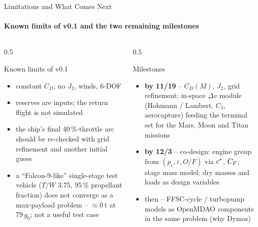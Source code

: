 \documentclass[aspectratio=169,10pt]{beamer}
\providecommand{\dv}{\Delta v}\providecommand{\gz}{g_0}\providecommand{\pc}{p_c}\providecommand{\dd}{\mathrm{d}}\providecommand{\eps}{\varepsilon}
\begin{document}
\begin{frame}{Limitations and What Comes Next}
  \framesubtitle{Known limits of v0.1 and the two remaining milestones}
  \begin{columns}[T]
    \begin{column}{0.5\textwidth}
      \begin{block}{Known limits of v0.1}
        \begin{itemize}
          \item constant $C_D$; no $J_2$, winds, 6-DOF
          \item reserves are inputs; the return flight is not simulated
          \item the ship's final 40\,\%-throttle arc should be re-checked with grid refinement and another initial guess
          \item a ``Falcon-9-like'' single-stage test vehicle ($T/W$ 3.75, 95\,\% propellant fraction) does not converge as a max-payload problem -- $\approx\SI{0}{\tonne}$ at 79\,$\gz$; not a useful test case
        \end{itemize}
      \end{block}
    \end{column}
    \begin{column}{0.5\textwidth}
      \begin{block}{Milestones}
        \begin{itemize}
          \item \textbf{by 11/19} -- $C_D(M)$, $J_2$, grid refinement; in-space $\dv$ module (Hohmann / Lambert, $C_3$, aerocapture) feeding the terminal set for the Mars, Moon and Titan missions
          \item \textbf{by 12/3} -- co-design: engine group from $(\pc,\eps,O/F)$ via ${c^{*}}$, ${C_F}$; stage mass model; dry masses and loads as design variables
          \item then -- FFSC-cycle / turbopump models as OpenMDAO components in the same problem (why Dymos)
        \end{itemize}
      \end{block}
    \end{column}
  \end{columns}
\end{frame}
\end{document}
